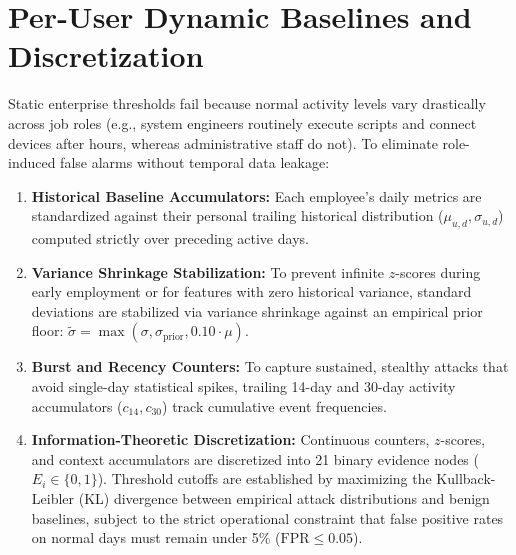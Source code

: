 \documentclass[12pt,a4paper]{report}
\begin{document}
\section{Per-User Dynamic Baselines and Discretization}
Static enterprise thresholds fail because normal activity levels vary drastically across job roles (e.g., system engineers routinely execute scripts and connect devices after hours, whereas administrative staff do not). To eliminate role-induced false alarms without temporal data leakage:
\begin{enumerate}
    \item \textbf{Historical Baseline Accumulators:} Each employee's daily metrics are standardized against their personal trailing historical distribution ($\mu_{u,d}, \sigma_{u,d}$) computed strictly over preceding active days.
    \item \textbf{Variance Shrinkage Stabilization:} To prevent infinite $z$-scores during early employment or for features with zero historical variance, standard deviations are stabilized via variance shrinkage against an empirical prior floor: $\tilde{\sigma} = \max(\sigma, \sigma_{\text{prior}}, 0.10 \cdot \mu)$.
    \item \textbf{Burst and Recency Counters:} To capture sustained, stealthy attacks that avoid single-day statistical spikes, trailing 14-day and 30-day activity accumulators ($c_{14}, c_{30}$) track cumulative event frequencies.
    \item \textbf{Information-Theoretic Discretization:} Continuous counters, $z$-scores, and context accumulators are discretized into 21 binary evidence nodes ($E_i \in \{0, 1\}$). Threshold cutoffs are established by maximizing the Kullback-Leibler (KL) divergence between empirical attack distributions and benign baselines, subject to the strict operational constraint that false positive rates on normal days must remain under 5\% ($\text{FPR} \le 0.05$).
\end{enumerate}
\end{document}
